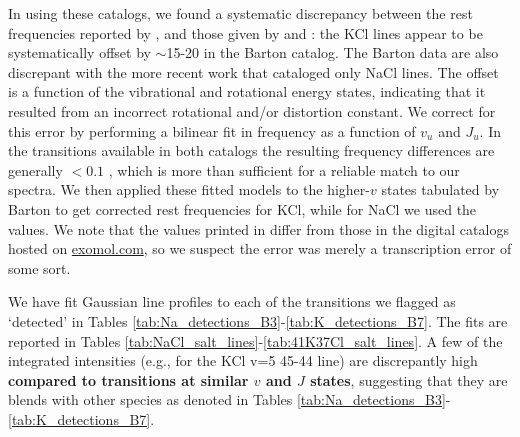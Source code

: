 \documentclass[twocolumn]{aastex62}
\newcommand{\referee}[1]{\textbf{#1}}
\begin{document}
In using these catalogs, we found a systematic discrepancy between the rest
frequencies reported by \citet{Barton2014a}, and those given by
\citet{Caris2004a} and \citet{Caris2002a}:
the KCl lines appear to be systematically offset by $\sim$15-20 \kms in the
Barton catalog.  The Barton data are also discrepant with the more recent
\citet{Cabezas2016a} work that cataloged only NaCl lines. The offset is a
function of the vibrational and rotational energy states, indicating that it
resulted from an incorrect rotational and/or distortion constant.  We correct
for this error by performing a bilinear fit in frequency as a function of $v_u$
and $J_u$.  In the transitions available in both catalogs the resulting
frequency differences are generally $<0.1$ \kms, which is more than sufficient
for a reliable match to our spectra.  We then applied these
fitted models to the higher-$v$ states tabulated by Barton to get corrected
rest frequencies for KCl, while for NaCl we used the \citet{Cabezas2016a}
values.  We note that the values printed in \citet{Barton2014a} differ from
those in the digital catalogs hosted on \url{exomol.com}, so we suspect the
error was merely a transcription error of some sort.


%
%
%








We have fit Gaussian line profiles to each of the transitions we flagged as
`detected' in Tables \ref{tab:Na_detections_B3}-\ref{tab:K_detections_B7}.
The fits are reported in Tables
\ref{tab:NaCl_salt_lines}-\ref{tab:41K37Cl_salt_lines}.  
A few of the integrated intensities (e.g., for the KCl v=5 45-44 line) are discrepantly
high \referee{compared to transitions at similar $v$ and $J$ states},
suggesting that they are blends with other species as denoted in Tables
\ref{tab:Na_detections_B3}-\ref{tab:K_detections_B7}.
\end{document}
